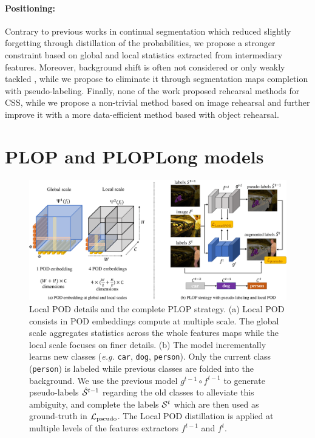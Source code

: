 \paragraph{Positioning:} Contrary to previous works in continual segmentation
\citep{michieli2019ilt,cermelli2020modelingthebackground} which reduced slightly forgetting through
distillation of the probabilities, we propose a stronger constraint based on global and local
statistics extracted from intermediary features. Moreover, background shift is often not considered
\citep{michieli2019ilt} or only weakly tackled \citep{cermelli2020modelingthebackground}, while we
propose to eliminate it through segmentation maps completion with pseudo-labeling. Finally, none of
the work proposed rehearsal methods for \ac{CSS}, while we propose a non-trivial method based on image
rehearsal and further improve it with a more data-efficient method based with object rehearsal.


\section{PLOP and PLOPLong models}
\label{sec:seg_plop}

\begin{figure}
    \centering
    \includegraphics[width=\linewidth]{images/seg/plop_strategy.pdf}
    \caption{Local POD details and the complete PLOP strategy. (a) Local POD consists in POD
        embeddings compute at multiple scale. The global scale aggregates statistics across the
        whole features maps while the local scale focuses on finer details.  (b) The model
        incrementally learns new classes (\textit{e.g.} \texttt{car}, \texttt{dog},
        \texttt{person}). Only the current class (\texttt{person}) is labeled while previous classes
        are folded into the background. We use the previous model $g^{t-1} \circ f^{t-1}$ to
        generate pseudo-labels $\hat{\mathcal{S}}^{t-1}$ regarding the old classes to alleviate this
        ambiguity, and complete the labels $\mathcal{S}^t$ which are then used as ground-truth in
        $\mathcal{L}_\text{pseudo}$. The Local POD distillation is applied at multiple levels of the
        features extractors $f^{t-1}$ and $f^t$.}
    \label{fig:seg_model_plop}
\end{figure}

